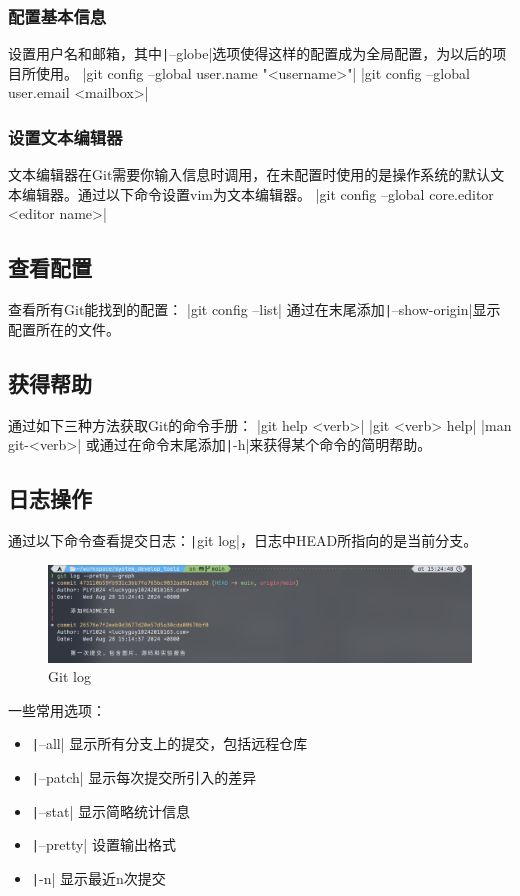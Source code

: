 \documentclass[fontset=ubuntu]{ctexart}
\begin{document}
\subsubsection{配置基本信息}
设置用户名和邮箱，其中\texttt|--globe|选项使得这样的配置成为全局配置，为以后的项目所使用。
|git config --global user.name "<username>"|
|git config --global user.email <mailbox>|

\subsubsection{设置文本编辑器}
文本编辑器在Git需要你输入信息时调用，在未配置时使用的是操作系统的默认文本编辑器。通过以下命令设置vim为文本编辑器。
|git config --global core.editor <editor name>|

\subsection{查看配置}
查看所有Git能找到的配置：
|git config --list|
通过在末尾添加\texttt|--show-origin|显示配置所在的文件。

\subsection{获得帮助}
通过如下三种方法获取Git的命令手册：
|git help <verb>|
|git <verb> help|
|man git-<verb>|
或通过在命令末尾添加\texttt|-h|来获得某个命令的简明帮助。

\subsection{日志操作}
通过以下命令查看提交日志：\texttt|git log|，日志中HEAD所指向的是当前分支。
\begin{figure}[htb]
    \centering
    \includegraphics[width=0.5\linewidth]{Git log.png}
    \caption{Git log}
    \label{fig:Git log}
\end{figure}

一些常用选项：
\begin{itemize}
    \item \texttt|--all| 显示所有分支上的提交，包括远程仓库
    \item \texttt|--patch| 显示每次提交所引入的差异
    \item \texttt|--stat| 显示简略统计信息
    \item \texttt|--pretty| 设置输出格式
    \item \texttt|-n| 显示最近n次提交
\end{itemize}
\end{document}
